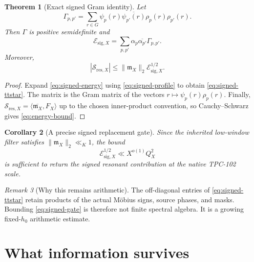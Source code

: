 \documentclass[11pt]{article}
\newtheorem{theorem}{Theorem}[section]
\newtheorem{corollary}[theorem]{Corollary}
\theoremstyle{remark}
\newtheorem{remark}[theorem]{Remark}
\begin{document}
\begin{theorem}[Exact signed Gram identity]
\label{thm:signed-gram}
Let
\begin{equation}
 \Gamma_{p,p'}
 =
 \sum_{r\in G}
 \psi_p(r)\overline{\psi_{p'}(r)}
 \rho_p(r)\rho_{p'}(r).
\label{eq:gram-kernel}
\end{equation}
Then \(\Gamma\) is positive semidefinite and
\begin{equation}
 \boxed{
 \mathcal E_{\mathrm{sig},X}
 =
 \sum_{p,p'}
 \alpha_p\overline{\alpha_{p'}}
 \Gamma_{p,p'}.}
\label{eq:signed-ttstar}
\end{equation}
Moreover,
\begin{equation}
 |\mathcal S_{\mathrm{res},X}|
 \le
 \|\mathfrak m_X\|_2
 \mathcal E_{\mathrm{sig},X}^{1/2}.
\label{eq:energy-bound}
\end{equation}
\end{theorem}

\begin{proof}
Expand \eqref{eq:signed-energy} using
\eqref{eq:signed-profile} to obtain
\eqref{eq:signed-ttstar}.  The matrix is the Gram matrix of the
vectors \(r\mapsto\psi_p(r)\rho_p(r)\).  Finally,
\(\mathcal S_{\mathrm{res},X}=\langle\overline{\mathfrak m_X},
F_X\rangle\) up to the chosen inner-product convention, so
Cauchy--Schwarz gives \eqref{eq:energy-bound}.
\end{proof}

\begin{corollary}[A precise signed replacement gate]
\label{cor:signed-gate}
Since the inherited low-window filter satisfies
\(\|\mathfrak m_X\|_2\ll_K1\), the bound
\begin{equation}
 \mathcal E_{\mathrm{sig},X}^{1/2}
 \ll X^{o(1)}Q_X^2
\label{eq:signed-gate}
\end{equation}
is sufficient to return the signed resonant contribution at the
native TPC-102 scale.
\end{corollary}

\begin{remark}[Why this remains arithmetic]
The off-diagonal entries of \eqref{eq:signed-ttstar} retain products
of the actual M\"obius signs, source phases, and masks.  Bounding
\eqref{eq:signed-gate} is therefore not finite spectral algebra.  It
is a growing fixed-\(h_0\) arithmetic estimate.
\end{remark}

\section{What information survives}
\end{document}
